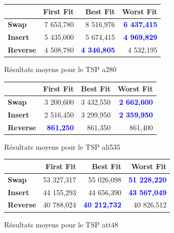 \documentclass[a4paper,10pt]{report}
\begin{document}

\begin{figure}[h]
  \begin{center}
    \begin{tabular}{|l|r|r|r|}
      \hline
      &		\textbf{First Fit}&	\textbf{Best Fit}&	\textbf{Worst
Fit}\\\hline
      \textbf{Swap}&	
	  7 653,780&
	  8 516,976&
	  \textbf{\textcolor{blue}{6 437,415}}\\\hline
      \textbf{Insert}&
	  5 435,000&
	  5 674,415&
	  \textbf{\textcolor{blue}{4 969,829}}\\\hline
      \textbf{Reverse}&
	  4 508,780&
	  \textbf{\textcolor{blue}{4 346,805}}&
	  4 532,195\\\hline
    \end{tabular}
    \label{a280-results}
    \caption{Résultats moyens pour le TSP a280}
  \end{center}
\end{figure}

\begin{figure}[h]
  \begin{center}
    \begin{tabular}{|l|r|r|r|}
      \hline
      &		\textbf{First Fit}&	\textbf{Best Fit}&	\textbf{Worst
Fit}\\\hline
      \textbf{Swap}&
	  3 200,600&
	  3 432,550&
	  \textbf{\textcolor{blue}{2 662,600}}\\\hline
      \textbf{Insert}&
	  2 516,450&
	  3 299,950&
	  \textbf{\textcolor{blue}{2 359,950}}\\\hline
      \textbf{Reverse}&
	  \textbf{\textcolor{blue}{861,250}}&
	  861,350&
	  861,400\\\hline
    \end{tabular}
    \label{ali535-results}
    \caption{Résultats moyens pour le TSP ali535}
  \end{center}
\end{figure}

\begin{figure}[h]
  \begin{center}
    \begin{tabular}{|l|r|r|r|}
      \hline
      &		\textbf{First Fit}&	\textbf{Best Fit}&	\textbf{Worst
Fit}\\\hline
      \textbf{Swap}&
	  53 327,317&
	  55 026,098&
	  \textbf{\textcolor{blue}{51 228,220}}\\\hline
      \textbf{Insert}&
	  44 155,293&
	  44 656,390&
	  \textbf{\textcolor{blue}{43 567,049}}\\\hline
      \textbf{Reverse}&
	  40 788,024&
	  \textbf{\textcolor{blue}{40 212,732}}&
	  40 826,512\\\hline
    \end{tabular}
    \label{att48-results}
    \caption{Résultats moyens pour le TSP att48}
  \end{center}
\end{figure}
\end{document}
